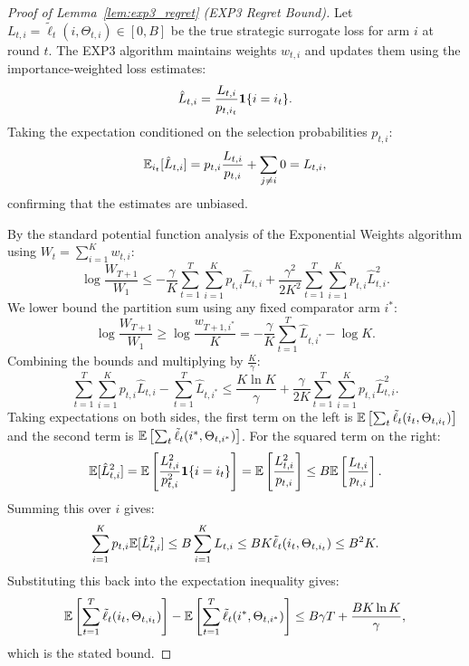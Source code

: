 \label{app:proof_exp3_regret}
\begin{proof}[Proof of Lemma~\ref{lem:exp3_regret} (EXP3 Regret Bound)]
Let $L_{t,i} = \tilde{\ell}_t(i, \Theta_{t,i}) \in [0, B]$ be the true strategic surrogate loss for arm $i$ at round $t$. The EXP3 algorithm maintains weights $w_{t,i}$ and updates them using the importance-weighted loss estimates:
\begin{equation}
    \hat{L}_{t,i} = \frac{L_{t,i}}{p_{t, i_t}} \mathbf{1}\{i = i_t\}.
\end{equation}
Taking the expectation conditioned on the selection probabilities $p_{t,i}$:
\begin{equation}
    \mathbb{E}_{i_t}[\hat{L}_{t,i}] = p_{t,i} \frac{L_{t,i}}{p_{t,i}} + \sum_{j \ne i} 0 = L_{t,i},
\end{equation}
confirming that the estimates are unbiased.

By the standard potential function analysis of the Exponential Weights algorithm using $W_t = \sum_{i=1}^K w_{t,i}$:
\begin{equation}
    \log\frac{W_{T+1}}{W_1} \le - \frac{\gamma}{K}\sum_{t=1}^T \sum_{i=1}^K p_{t,i} \hat{L}_{t,i} + \frac{\gamma^2}{2 K^2}\sum_{t=1}^T \sum_{i=1}^K p_{t,i} \hat{L}_{t,i}^2.
\end{equation}
We lower bound the partition sum using any fixed comparator arm $i^*$:
\begin{equation}
    \log\frac{W_{T+1}}{W_1} \ge \log \frac{w_{T+1, i^*}}{K} = - \frac{\gamma}{K}\sum_{t=1}^T \hat{L}_{t, i^*} - \log K.
\end{equation}
Combining the bounds and multiplying by $\frac{K}{\gamma}$:
\begin{equation}
    \sum_{t=1}^T \sum_{i=1}^K p_{t,i} \hat{L}_{t,i} - \sum_{t=1}^T \hat{L}_{t, i^*} \le \frac{K \ln K}{\gamma} + \frac{\gamma}{2 K}\sum_{t=1}^T \sum_{i=1}^K p_{t,i} \hat{L}_{t,i}^2.
\end{equation}
Taking expectations on both sides, the first term on the left is $\mathbb{E}\left[\sum_t \tilde{\ell}_t(i_t, \Theta_{t, i_t})\right]$ and the second term is $\mathbb{E}\left[\sum_t \tilde{\ell}_t(i^*, \Theta_{t, i^*})\right]$. For the squared term on the right:
\begin{equation}
    \mathbb{E}[\hat{L}_{t,i}^2] = \mathbb{E}\left[ \frac{L_{t,i}^2}{p_{t,i}^2} \mathbf{1}\{i = i_t\} \right] = \mathbb{E}\left[ \frac{L_{t,i}^2}{p_{t,i}} \right] \le B \mathbb{E}\left[ \frac{L_{t,i}}{p_{t,i}} \right].
\end{equation}
Summing this over $i$ gives:
\begin{equation}
    \sum_{i=1}^K p_{t,i} \mathbb{E}[\hat{L}_{t,i}^2] \le B \sum_{i=1}^K L_{t,i} \le B K \tilde{\ell}_t(i_t, \Theta_{t, i_t}) \le B^2 K.
\end{equation}
Substituting this back into the expectation inequality gives:
\begin{equation}
    \mathbb{E}\left[ \sum_{t=1}^T \tilde{\ell}_t(i_t, \Theta_{t, i_t}) \right] - \mathbb{E}\left[ \sum_{t=1}^T \tilde{\ell}_t(i^*, \Theta_{t, i^*}) \right] \le B \gamma T + \frac{B K \ln K}{\gamma},
\end{equation}
which is the stated bound.
\end{proof}

